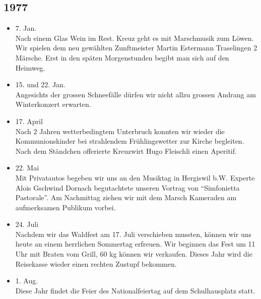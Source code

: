 \subsection{1977}

\begin{history}


    \begin{itemize}

        \item 7. Jan.\\
              Nach einem Glas Wein im Rest. Kreuz geht es mit Marschmusik zum Löwen.
              Wir spielen dem neu gewählten Zunftmeister Martin Estermann Traselingen
              2 Märsche. Erst in den späten Morgenstunden begibt man sich auf den
              Heimweg.

        \item 15. und 22. Jan.\\
              Angesichts der grossen Schneefälle dürfen wir nicht allzu grossen
              Andrang am Winterkonzert erwarten.

        \item 17. April\\
              Nach 2 Jahren wetterbedingtem Unterbruch konnten wir wieder die
              Kommunionskinder bei strahlendem Frühlingswetter zur Kirche begleiten.
              Nach dem Ständchen offerierte Kreuzwirt Hugo Fleischli einen Aperitif.

        \item 22. Mai\\
              Mit Privatautos begeben wir uns an den Musiktag in Hergiswil b.W.
              Experte Alois Gschwind Dornach begutachtete unseren Vortrag von
              \enquote{Simfonietta Pastorale}. Am Nachmittag ziehen wir mit dem Marsch
              Kameraden am aufmerksamen Publikum vorbei.

        \item 24. Juli\\
              Nachdem wir das Waldfest am 17. Juli verschieben mussten, können wir uns
              heute an einem herrlichen Sommertag erfreuen. Wir beginnen das Fest um
              11 Uhr mit Braten vom Grill, 60 kg können wir verkaufen. Dieses Jahr
              wird die Reisekasse wieder einen rechten Zustupf bekommen.

        \item 1. Aug.\\
              Diese Jahr findet die Feier des Nationalfeiertag auf dem Schulhausplatz
              statt.


\end{itemize}
\end{history}
